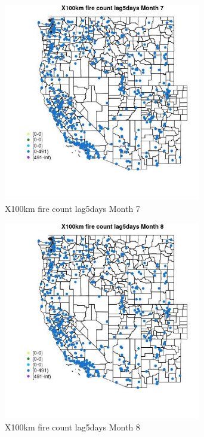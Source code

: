 \begin{figure} 
\centering  
\includegraphics[width=0.77\textwidth]{Code_Outputs/Report_ML_input_PM25_Step4_part_e_de_duplicated_aves_compiled_2019-05-14wNAs_MapObsMo7X100km_fire_count_lag5days.jpg} 
\caption{\label{fig:Report_ML_input_PM25_Step4_part_e_de_duplicated_aves_compiled_2019-05-14wNAsMapObsMo7X100km_fire_count_lag5days}X100km fire count lag5days Month 7} 
\end{figure} 
 

\begin{figure} 
\centering  
\includegraphics[width=0.77\textwidth]{Code_Outputs/Report_ML_input_PM25_Step4_part_e_de_duplicated_aves_compiled_2019-05-14wNAs_MapObsMo8X100km_fire_count_lag5days.jpg} 
\caption{\label{fig:Report_ML_input_PM25_Step4_part_e_de_duplicated_aves_compiled_2019-05-14wNAsMapObsMo8X100km_fire_count_lag5days}X100km fire count lag5days Month 8} 
\end{figure} 
 

